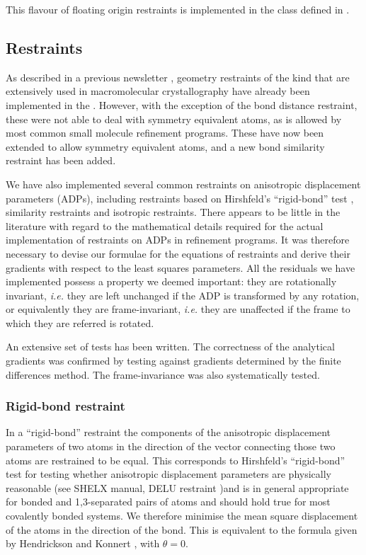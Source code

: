 \documentclass[12pt]{article}
\begin{document}
This flavour of floating origin restraints is implemented in the \cpp class  defined in .
\subsection{Restraints}

As described in a previous \cctbx newsletter \cite{cctbxnews:2004b}, geometry restraints of the kind that are extensively used in macromolecular crystallography have already been implemented in the \cctbx.  However, with the exception of the bond distance restraint, these were not able to deal with symmetry equivalent atoms, as is allowed by most common small molecule refinement programs.  These have now been extended to allow symmetry equivalent atoms, and a new bond similarity restraint has been added.

We have also implemented several common restraints on anisotropic displacement parameters (ADPs), including restraints based on Hirshfeld's ``rigid-bond'' test \cite{Hirshfeld:1976}, similarity restraints and isotropic restraints.
There appears to be little in the literature with regard to the mathematical details required for the actual implementation of restraints on ADPs in refinement programs. It was therefore necessary to devise our formulae for the equations of restraints and derive their gradients with respect to the least squares parameters. All the residuals we have implemented possess a property we deemed important: they are rotationally invariant, \emph{i.e.} they are left unchanged if the ADP is transformed by any rotation, or equivalently they are frame-invariant, \emph{i.e.} they are unaffected if the frame to which they are referred is rotated.

An extensive set of tests has been written. The correctness of the analytical gradients was confirmed by testing against gradients determined by the finite differences method. The frame-invariance was also systematically tested.

\subsubsection{Rigid-bond restraint}

In a ``rigid-bond'' restraint the components of the anisotropic displacement parameters of two atoms in the direction of the vector connecting those two atoms are restrained to be equal. This corresponds to Hirshfeld's ``rigid-bond'' test \cite{Hirshfeld:1976} for testing whether anisotropic displacement parameters are physically reasonable (see SHELX manual, DELU restraint \cite{SHELX:man97})and is in general appropriate for bonded and 1,3-separated pairs of atoms and should hold true for most covalently bonded systems. We therefore minimise the mean square displacement of the atoms in the direction of the bond. This is equivalent to the formula given by Hendrickson and Konnert \cite{Hendrickson:1980}, with $\theta=0$.
\end{document}
